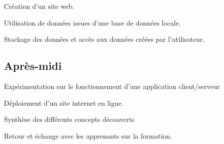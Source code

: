 \documentclass
	[a4paper,
	 11pt     ,
	 babel-en ;
	]
{article}
\begin{document}
Création d'un site web.

Utilisation de données issues d'une base de données locale.

Stockage des données et accès aux données créées par l'utilisateur.

\hypertarget{apruxe8s-midi-1}{%
\subsection{Après-midi}\label{apruxe8s-midi-1}}

Expérimentation sur le fonctionnement d'une application client/serveur

Déploiement d'un site internet en ligne.

Synthèse des différents concepts découverts

Retour et échange avec les apprenants sur la formation.
\end{document}
